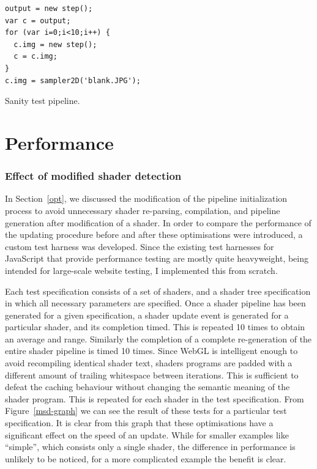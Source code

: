 \documentclass[12pt,twoside,notitlepage]{report}
\begin{document}
\begin{listing}[H]
\begin{verbatim}
output = new step(); 
var c = output;
for (var i=0;i<10;i++) {
  c.img = new step();
  c = c.img;
}
c.img = sampler2D('blank.JPG');
\end{verbatim}
\caption{Sanity test pipeline.\label{sanity-pipe}}
\end{listing}

\section{Performance}
\subsubsection{Effect of modified shader detection}
In Section~\ref{opt}, we discussed the modification of the pipeline initialization process to avoid unnecessary shader re-parsing, compilation, and pipeline generation after modification of a shader. In order to compare the performance of the updating procedure before and after these optimisations were introduced, a custom test harness was developed. Since the existing test harnesses for JavaScript that provide performance testing are mostly quite heavyweight, being intended for large-scale website testing, I implemented this from scratch.

Each test specification consists of a set of shaders, and a shader tree specification in which all necessary parameters are specified. Once a shader pipeline has been generated for a given specification, a shader update event is generated for a particular shader, and its completion timed. This is repeated 10 times to obtain an average and range. Similarly the completion of a complete re-generation of the entire shader pipeline is timed 10 times. Since WebGL is intelligent enough to avoid recompiling identical shader text, shaders programs are padded with a different amount of trailing whitespace between iterations. This is sufficient to defeat the caching behaviour without changing the semantic meaning of the shader program. This is repeated for each shader in the test specification. From Figure~\ref{msd-graph} we can see the result of these tests for a particular test specification. It is clear from this graph that these optimisations have a significant effect on the speed of an update. While for smaller examples like ``simple'', which consists only a single shader, the difference in performance is unlikely to be noticed, for a more complicated example the benefit is clear.
\end{document}
